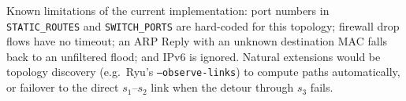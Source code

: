 \documentclass[11pt,a4paper]{article}
\newcommand{\code}[1]{\texttt{#1}}
\begin{document}
Known limitations of the current implementation: port numbers in
\code{STATIC\_ROUTES} and \code{SWITCH\_PORTS} are hard-coded for this topology;
firewall drop flows have no timeout; an ARP Reply with an unknown destination MAC
falls back to an unfiltered flood; and IPv6 is ignored. Natural extensions
would be topology discovery (e.g.\ Ryu's \code{--observe-links}) to compute
paths automatically, or failover to the direct $s_1$--$s_2$ link when the detour
through $s_3$ fails.
\end{document}
